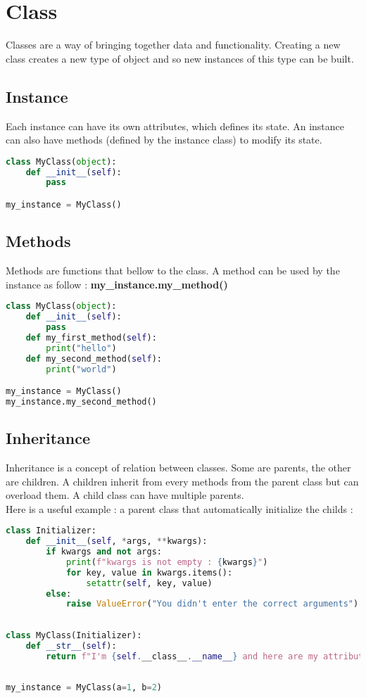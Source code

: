 \documentclass[a4paper, 12pt, titlepage]{scrartcl} %
\begin{document}
\newpage
\section{Class}
\label{sec:Class}
Classes are a way of bringing together data and functionality. Creating a new class creates a new type of object and so new instances of this type can be built.\newline

\subsection{Instance}
Each instance can have its own attributes, which defines its state. An instance can also have methods (defined by the instance class) to modify its state.
\begin{lstlisting}[language=Python]
class MyClass(object):
	def __init__(self):
		pass

my_instance = MyClass()
\end{lstlisting} \vspace{5mm}

\subsection{Methods}
Methods are functions that bellow to the class. A method can be used by the instance as follow  : \textbf{my\_instance.my\_method()}
\begin{lstlisting}[language=Python]
class MyClass(object):
	def __init__(self):
		pass
	def my_first_method(self):
	    print("hello")
	def my_second_method(self):
	    print("world")

my_instance = MyClass()
my_instance.my_second_method()
\end{lstlisting} \vspace{5mm}

\subsection{Inheritance}
Inheritance is a concept of relation between classes. Some are parents, the other are children. A children inherit from every methods from the parent class but can overload them. A child class can have multiple parents. \\
Here is a useful example : a parent class that automatically initialize the childs :
\begin{lstlisting}[language=Python]
class Initializer:
    def __init__(self, *args, **kwargs):
        if kwargs and not args:
            print(f"kwargs is not empty : {kwargs}")
            for key, value in kwargs.items():
                setattr(self, key, value)
        else:
            raise ValueError("You didn't enter the correct arguments")
 
 
class MyClass(Initializer):
    def __str__(self):
        return f"I'm {self.__class__.__name__} and here are my attributes : {self.__dict__}"
 
 
my_instance = MyClass(a=1, b=2)
\end{lstlisting} \vspace{5mm}
\end{document}
